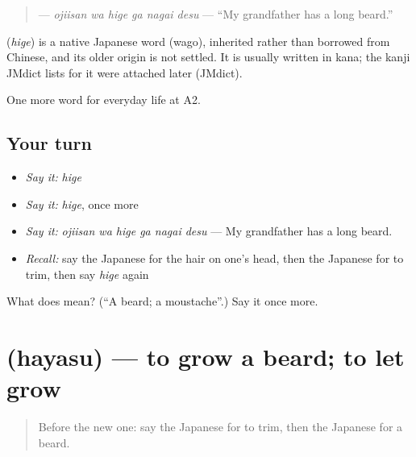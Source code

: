 \begin{quote}
\textbf{  } — \emph{ojiisan wa hige ga nagai desu} — \textquotedblleft{}My grandfather has a long beard.\textquotedblright{}
\end{quote}

\begin{cousinweb}
\textbf{} (\emph{hige}) is a native Japanese word (wago), inherited rather than borrowed from Chinese, and its older origin is not settled. It is usually written in kana; the kanji JMdict lists for it were attached later (JMdict).
\end{cousinweb}

\begin{grammarlens}[title={What you've built}]
One more word for everyday life at A2.
\end{grammarlens}

\subsection*{Your turn}
\begin{itemize}
\raggedright
  \item \emph{Say it:} \emph{hige}
  \item \emph{Say it:} \emph{hige}, once more
  \item \emph{Say it:} \emph{ojiisan wa hige ga nagai desu} — My grandfather has a long beard.
  \item \emph{Recall:} say the Japanese for the hair on one's head, then the Japanese for to trim, then say \emph{hige} again
\end{itemize}

\begin{tcolorbox}[breakable,colback=teal!4,colframe=teal!35!black,title={Before you move on}]
What does  mean? (\textquotedblleft{}A beard; a moustache\textquotedblright{}.) Say it once more.
\end{tcolorbox}
\section[\texorpdfstring{\ja{はやす} (hayasu)}{はやす (hayasu)}]{ (hayasu) — to grow a beard; to let grow}

\label{lesson:JA-C148-hayasu}



\begin{quote}
Before the new one: say the Japanese for to trim, then the Japanese for a beard.
\end{quote}

